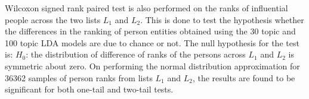 Wilcoxon signed rank paired test is also performed on the ranks of influential people across the two lists $L_1$ and $L_2$. This is done to test the hypothesis whether the differences in the ranking of person entities obtained using the 30 topic and 100 topic LDA models are due to chance or not. The null hypothesis for the test is: 
$H_0$: the distribution of difference of ranks of the persons across $L_1$ and $L_2$ is symmetric about zero. On performing the normal distribution approximation for 36362 samples of person ranks from lists $L_1$ and $L_2$, the results are found to be significant for both one-tail and two-tail tests.


